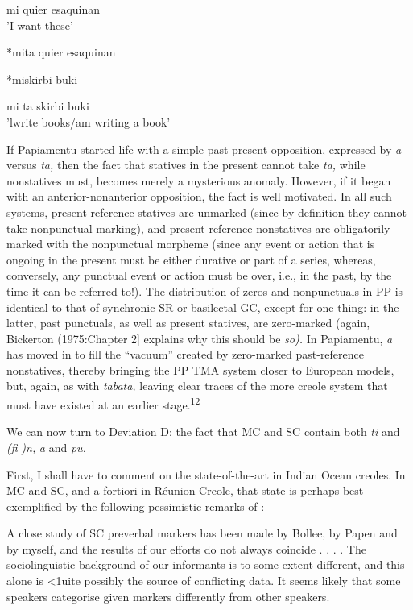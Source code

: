 \ea\label{ex:99}
 mi quier esaquinan \\
\glt 'I want these'
\z

\ea\label{ex:160}
 *mita quier esaquinan
\z

\ea\label{ex:101}
 *miskirbi buki
\z

\ea\label{ex:102}
 mi ta skirbi buki \\
\glt 'lwrite books/am writing a book'
\z



If Papiamentu started life with a simple past-present opposition,
expressed by \textit{a} versus \textit{ta,} then the fact that statives in the present cannot take \textit{ta,} while nonstatives must, becomes merely a mysterious anomaly. However, if it began with an anterior-nonanterior opposition, the fact is well motivated. In all such systems, present-reference statives are unmarked (since by definition they cannot take nonpunctual mark\-ing), and present-reference nonstatives are obligatorily marked with the nonpunctual morpheme (since any event or action that is ongoing in the present must be either durative or part of a series, whereas, con\-versely, any punctual event or action must be over, i.e., in the past, by the time it can be referred to!). The distribution of zeros and nonpunctuals in PP is identical to that of synchronic SR or basilectal GC, except for one thing: in the latter, past punctuals, as well as present statives, are zero-marked (again, Bickerton (1975:Chapter 2] explains why this should be \textit{so).} In Papiamentu, \textit{a} has moved in to fill the ``vacuum'' created by zero-marked past-reference nonstatives, thereby bringing the PP TMA system closer to European models, but, again, as with \textit{tabata,} leaving clear traces of the more creole system that must have existed at an earlier stage.\textsuperscript{12}

We can now turn to Deviation D: the fact that MC and SC contain both \textit{ti} and \textit{(}\textit{fi} \textit{)n,} \textit{a} and \textit{pu.}

First, I shall have to comment on the state-of-the-art in Indian Ocean creoles. In MC and SC, and a fortiori in Réunion Creole, that state is perhaps best exemplified by the following pessimistic remarks of \citet[94-95]{Corne1977}:

A close study of SC preverbal markers has been made by Bollee, by Papen and by myself, and the results of our efforts do not always coincide . . . . The sociolinguistic background of our informants is to some extent different, and this alone is {\textless}1uite possibly the source of conflicting data. It seems likely that some speakers categorise given markers differently from other speakers.

